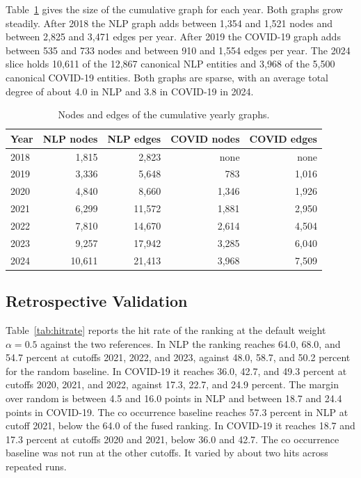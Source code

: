 \documentclass{ieeeaccess}
\begin{document}
Table~\ref{tab:graph} gives the size of the cumulative graph for each year. Both graphs grow steadily. After 2018 the NLP graph adds between 1,354 and 1,521 nodes and between 2,825 and 3,471 edges per year. After 2019 the COVID-19 graph adds between 535 and 733 nodes and between 910 and 1,554 edges per year. The 2024 slice holds 10,611 of the 12,867 canonical NLP entities and 3,968 of the 5,500 canonical COVID-19 entities. Both graphs are sparse, with an average total degree of about 4.0 in NLP and 3.8 in COVID-19 in 2024.

\begin{table}[t]
\caption{Nodes and edges of the cumulative yearly graphs.}
\label{tab:graph}
\footnotesize
\setlength{\tabcolsep}{4pt}
\begin{tabular}{lrrrr}
\toprule
Year & NLP nodes & NLP edges & COVID nodes & COVID edges \\
\midrule
2018 & 1,815 & 2,823 & none & none \\
2019 & 3,336 & 5,648 & 783 & 1,016 \\
2020 & 4,840 & 8,660 & 1,346 & 1,926 \\
2021 & 6,299 & 11,572 & 1,881 & 2,950 \\
2022 & 7,810 & 14,670 & 2,614 & 4,504 \\
2023 & 9,257 & 17,942 & 3,285 & 6,040 \\
2024 & 10,611 & 21,413 & 3,968 & 7,509 \\
\bottomrule
\end{tabular}
\end{table}

\subsection{Retrospective Validation}

Table~\ref{tab:hitrate} reports the hit rate of the ranking at the default weight $\alpha = 0.5$ against the two references. In NLP the ranking reaches 64.0, 68.0, and 54.7 percent at cutoffs 2021, 2022, and 2023, against 48.0, 58.7, and 50.2 percent for the random baseline. In COVID-19 it reaches 36.0, 42.7, and 49.3 percent at cutoffs 2020, 2021, and 2022, against 17.3, 22.7, and 24.9 percent. The margin over random is between 4.5 and 16.0 points in NLP and between 18.7 and 24.4 points in COVID-19. The co occurrence baseline reaches 57.3 percent in NLP at cutoff 2021, below the 64.0 of the fused ranking. In COVID-19 it reaches 18.7 and 17.3 percent at cutoffs 2020 and 2021, below 36.0 and 42.7. The co occurrence baseline was not run at the other cutoffs. It varied by about two hits across repeated runs.
\end{document}
